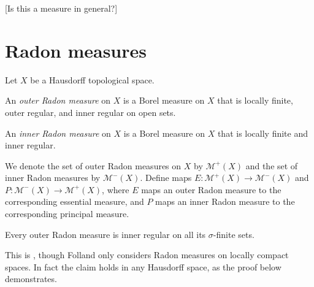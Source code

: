 \documentclass[article, a4paper, 11pt, oneside]{memoir}
\numberwithin{equation}{chapter}
\begin{document}
[Is this a measure in general?]



\chapter{Radon measures}

Let $X$ be a Hausdorff topological space.

\newcommand{\calM}{\mathcal{M}}
\newcommand{\radonout}{\calM^{+}}
\newcommand{\radonin}{\calM^{-}}

\begin{definition}
    An \emph{outer Radon measure} on $X$ is a Borel measure on $X$ that is locally finite, outer regular, and inner regular on open sets.

    An \emph{inner Radon measure} on $X$ is a Borel measure on $X$ that is locally finite and inner regular.
\end{definition}
%
We denote the set of outer Radon measures on $X$ by $\radonout(X)$ and the set of inner Radon measures by $\radonin(X)$. Define maps $E \colon \radonout(X) \to \radonin(X)$ and $P \colon \radonin(X) \to \radonout(X)$, where $E$ maps an outer Radon measure to the corresponding essential measure, and $P$ maps an inner Radon measure to the corresponding principal measure.


\begin{proposition}
    \label{thm:outer-Radon-inner-regular-on-finites}
    Every outer Radon measure is inner regular on all its $\sigma$-finite sets.
\end{proposition}
%
This is \textcite[Proposition~7.5]{folland2007}, though Folland only considers Radon measures on locally compact spaces. In fact the claim holds in any Hausdorff space, as the proof below demonstrates.
\end{document}
